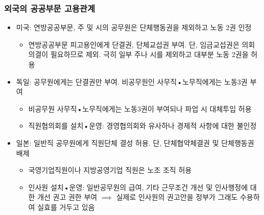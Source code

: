 \documentclass[aspectratio=169,xcolor=dvipsnames,handout]{beamer}
\begin{document}
\begin{frame}[allowframebreaks]
    \frametitle{외국의 공공부문 고용관계}
    \begin{itemize}[<+->]
        \item 미국: 연방공공부문, 주 및 시의 공무원은 단체행동권을 제외하고 노동 2권 인정
        \begin{itemize}
            \item 연방공공부문 피고용인에게 단결권, 단체교섭권 부여. 단, 임금교섭권은 의회 의결이 필요하므로 제외. 극히 일부 주나 시를 제외하고 대부분 노동 2권을 허용
        \end{itemize}
        \item 독일: 공무원에게는 단결권만 부여. 비공무원인 사무직•노무직에게는 노동3권 부여
        \begin{itemize}
            \item 비공무원 사무직•노무직에게는 노동3권이 부여되나 파업 시 대체투입 허용
            \item 직원협의회를 설치•운영: 경영협의회와 유사하나 경제적 사항에 대한 불인정
        \end{itemize}
    \framebreak%
        \item 일본: 일반직 공무원에게 직원단체 결성 허용. 단, 단체협약체결권 및 단체행동권 배제
        \begin{itemize}
            \item 국영기업직원이나 지방공영기업 직원은 노조 조직 허용
            \item 인사원 설치•운영: 일반공무원의 급여, 기타 근무조건 개선 및 인사행정에 대한 개선 권고 권한 부여 $\implies$ 실제로 인사원의 권고안을 정부가 그래도 수용하여 실효를 거두고 있음
        \end{itemize}
    \end{itemize}
\end{frame}
\end{document}
